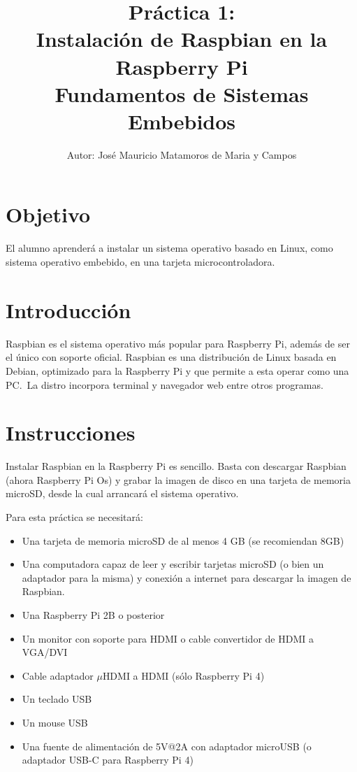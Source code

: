 \documentclass[letterpaper,10.5pt]{article}
\author{\footnotesize Autor: José Mauricio Matamoros de Maria y Campos}
\title{Práctica 1:\\Instalación de Raspbian en la Raspberry Pi\\
{\large Fundamentos de Sistemas Embebidos}}
\date{}
\begin{document}
\maketitle

\section{Objetivo}%
\label{sec:objective}
El alumno aprenderá a instalar un sistema operativo basado en Linux, como sistema operativo embebido, en una tarjeta microcontroladora.

\section{Introducción}%
\label{sec:introduction}
Raspbian es el sistema operativo más popular para Raspberry Pi, además de ser el único con soporte oficial.
Raspbian es una distribución de Linux basada en Debian, optimizado para la Raspberry Pi y que permite a esta operar como una PC.~La distro incorpora terminal y navegador web entre otros programas.

\section{Instrucciones}%
\label{sec:instructions}

Instalar Raspbian en la Raspberry Pi es sencillo.
Basta con descargar Raspbian (ahora Raspberry Pi Os) y grabar la imagen de disco en una tarjeta de memoria microSD, desde la cual arrancará el sistema operativo.

Para esta práctica se necesitará:
\begin{itemize}[nosep]
	\item Una tarjeta de memoria microSD de al menos 4 GB (se recomiendan 8GB)
	\item Una computadora capaz de leer y escribir tarjetas microSD (o bien un adaptador para la misma) y conexión a internet para descargar la imagen de Raspbian.
	\item Una Raspberry Pi 2B o posterior
	\item Un monitor con soporte para HDMI o cable convertidor de HDMI a VGA/DVI
	\item Cable adaptador $\mu$HDMI a HDMI (sólo Raspberry Pi 4)
	\item Un teclado USB
	\item Un mouse USB
	\item Una fuente de alimentación de 5V@2A con adaptador microUSB (o adaptador USB-C para Raspberry Pi 4)
\end{itemize}
\end{document}
